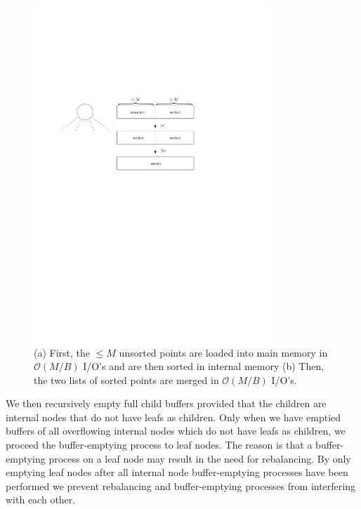 \documentclass[twoside,11pt,openright]{report}
\begin{document}
\begin{figure}[h]
	\centering
	\includegraphics[width=0.8\textwidth]{../figures/buffer_tree_buffer_sort}
	\caption{(a) First, the $\leq M$ unsorted points are loaded into main memory in $\mathcal{O}(M/B)$ I/O's and are then sorted in internal memory (b) Then, the two lists of sorted points are merged in $\mathcal{O}(M/B)$ I/O's.}
	\label{fig:buffer_tree_buffer_sort}
\end{figure}

We then recursively empty full child buffers provided that the children are internal nodes that do not have leafs as children. Only when we have emptied buffers of all overflowing internal nodes which do not have leafs as children, we proceed the buffer-emptying process to leaf nodes. The reason is that a buffer-emptying process on a leaf node may result in the need for rebalancing. By only emptying leaf nodes after all internal node buffer-emptying processes have been performed we prevent rebalancing and buffer-emptying processes from interfering with each other.
\end{document}
